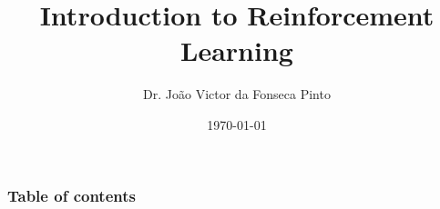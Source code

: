 \documentclass{beamer}
\begin{document}
\title{Introduction to Reinforcement Learning}  
\author{Dr. João Victor da Fonseca Pinto}
\date{\today} 

\begin{frame}
\titlepage
\end{frame}

\begin{frame}
    \frametitle{Table of contents}
    \tableofcontents
\end{frame} 




\end{document}
